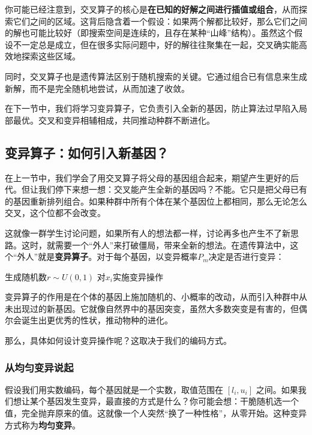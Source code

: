 \documentclass[lang=cn,zihao=-4,a4paper,fontset=windows]{beautybook}
\begin{document}
你可能已经注意到，交叉算子的核心是\textbf{在已知的好解之间进行插值或组合}，从而探索它们之间的区域。这背后隐含着一个假设：如果两个解都比较好，那么它们之间的解也可能比较好（即搜索空间是连续的，且存在某种“山峰”结构）。虽然这个假设不一定总是成立，但在很多实际问题中，好的解往往聚集在一起，交叉确实能高效地探索这些区域。

同时，交叉算子也是遗传算法区别于随机搜索的关键。它通过组合已有信息来生成新解，而不是完全随机地尝试，从而加速了收敛。

在下一节中，我们将学习变异算子，它负责引入全新的基因，防止算法过早陷入局部最优。交叉和变异相辅相成，共同推动种群不断进化。

\subsection{变异算子：如何引入新基因？}

在上一节中，我们学会了用交叉算子将父母的基因组合起来，期望产生更好的后代。但让我们停下来想一想：交叉能产生全新的基因吗？不能。它只是把父母已有的基因重新排列组合。如果种群中所有个体在某个基因位上都相同，那么无论怎么交叉，这个位都不会改变。

这就像一群学生讨论问题，如果所有人的想法都一样，讨论再多也产生不了新思路。这时，就需要一个“外人”来打破僵局，带来全新的想法。在遗传算法中，这个“外人”就是\textbf{变异算子}。对于每个基因，以变异概率$P_m$决定是否进行变异：

\begin{algorithm}[H]
\caption{基本变异操作}
\begin{algorithmic}[1]
        \STATE 生成随机数$r \sim U(0,1)$
            \STATE 对$x_i$实施变异操作
        \ENDIF
    \ENDFOR
\ENDFOR
\end{algorithmic}
\end{algorithm}

变异算子的作用是在个体的基因上施加随机的、小概率的改动，从而引入种群中从未出现过的新基因。它就像自然界中的基因突变，虽然大多数突变是有害的，但偶尔会诞生出更优秀的性状，推动物种的进化。

那么，具体如何设计变异操作呢？这取决于我们的编码方式。

\subsubsection{从均匀变异说起}

假设我们用实数编码，每个基因就是一个实数，取值范围在 $[l_i, u_i]$ 之间。如果我们想让某个基因发生变异，最直接的方式是什么？你可能会想：干脆随机选一个值，完全抛弃原来的值。这就像一个人突然“换了一种性格”，从零开始。这种变异方式称为\textbf{均匀变异}。
\end{document}
